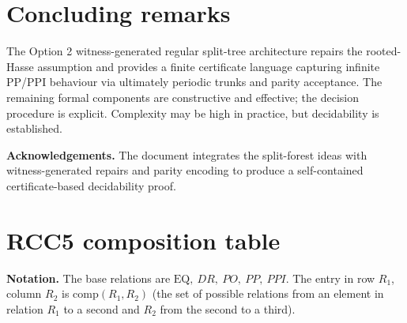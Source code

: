 \documentclass[11pt]{article}
\newcommand{\EQ}{\mathrm{EQ}}
\begin{document}
\section{Concluding remarks}
\label{sec:conclusion}

The Option 2 witness-generated regular split-tree architecture repairs the
rooted-Hasse assumption and provides a finite certificate language capturing
infinite PP/PPI behaviour via ultimately periodic trunks and parity acceptance.
The remaining formal components are constructive and effective; the decision
procedure is explicit. Complexity may be high in practice, but decidability is
established.

\medskip
\noindent\textbf{Acknowledgements.} The document integrates the split-forest
ideas with witness-generated repairs and parity encoding to produce a
self-contained certificate-based decidability proof.


\appendix
\section{RCC5 composition table}
\label{app:rcc5-table}

\noindent\textbf{Notation.} The base relations are
\(\EQ,\ DR,\ PO,\ PP,\ PPI\). The entry in row \(R_1\), column \(R_2\) is
\(\mathrm{comp}(R_1,R_2)\) (the set of possible relations from an element in
relation \(R_1\) to a second and \(R_2\) from the second to a third).
\end{document}
